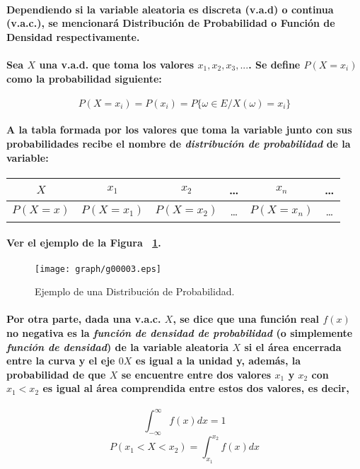 \paragraph{
Dependiendo si la variable aleatoria es discreta (v.a.d) o continua (v.a.c.), se mencionará Distribución de Probabilidad o Función de Densidad respectivamente.
}
\paragraph{
Sea $X$ una v.a.d. que toma los valores ${x_1,x_2,x_3,...}$. Se define $P(X = x_i)$ como la probabilidad siguiente:
}
\begin{equation}
P(X=x_i)=P(x_i)=P\{\omega \in E / X(\omega) = x_i\}
\end{equation}
\paragraph{
A la tabla formada por los valores que toma la variable junto con sus probabilidades recibe el nombre de \emph{distribución de probabilidad} de la variable:\\
}
\begin{tabular}{ c c c c c c }
\hline
$X$ & $x_1$ & $x_2$ & \ldots & $x_n$ & \ldots \\
\hline
$P(X = x)$ & $P(X = x_1)$ & $P(X = x_2)$ & \ldots & $P(X = x_n)$ & \ldots \\
\hline
\end{tabular}
\paragraph{
Ver el ejemplo de la Figura ~\ref{fig:DistribucionDeProbabilidad}.
}
\begin{figure}[ht]
\centering
\texttt{[image: graph/g00003.eps]}
\caption[Distribución de Probabilidad]{Ejemplo de una Distribución de Probabilidad.}
\label{fig:DistribucionDeProbabilidad}
\end{figure}
\paragraph{
Por otra parte, dada una v.a.c. $X$, se dice que una función real $f(x)$ no negativa es la \emph{función de densidad de probabilidad} (o simplemente \emph{función de densidad}) de la variable aleatoria $X$ si el área encerrada entre la curva y el eje $0X$ es igual a la unidad y, además, la probabilidad de que $X$ se encuentre entre dos valores $x_1$ y $x_2$ con $x_1 < x_2$ es igual al área comprendida entre estos dos valores, es decir,
}
\begin{equation}
\displaystyle\int_{-\infty}^{\infty}f(x)dx = 1
\end{equation}
\begin{equation}
P(x_1 < X < x_2) = \displaystyle\int_{x_1}^{x_2}f(x)dx
\end{equation}



